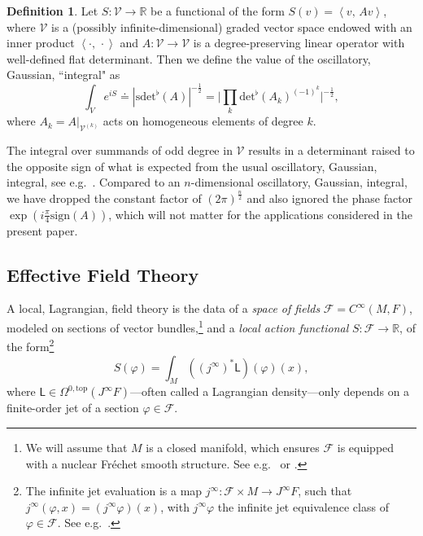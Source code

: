\documentclass[reqno]{amsart}
\theoremstyle{definition}
\newtheorem{defn}[thm]{Definition}
\theoremstyle{remark}
\renewcommand{\phi}{\varphi}
\newcommand{\V}{\mathcal{V}}
\newcommand{\R}{\mathbb{R}}
\newcommand{\C}{C^\infty}
\newcommand{\F}{\mathcal{F}}
\newcommand{\sfL}{\mathsf{L}}
\renewcommand{\det}{\mathrm{det}^\flat}
\newcommand{\sdet}{\mathrm{sdet}^\flat}
\newcommand{\pair}[2]{\left\langle #1,\, #2 \right\rangle}
\begin{document}
\begin{defn}
\label{fresnel}
Let $S: \V \to \R$ be a functional of the form $S(v) = \pair{v}{Av}$, where $\V$ is a (possibly infinite-dimensional) graded vector space endowed with an inner product $\pair{\cdot}{\cdot}$ and $A:\V \to \V$ is a degree-preserving linear operator with well-defined flat determinant. Then we define the value of the oscillatory, Gaussian, ``integral" as
\begin{equation}
    \int_V e^{iS} \doteq  |\sdet(A)|^{-\frac{1}{2}}= \bigl|\prod_k \det(A_k)^{(-1)^k}\bigr|^{-\frac{1}{2}},
\end{equation}
where $A_k=A\vert_{\mathcal{V}^{(k)}}$ acts on homogeneous elements of degree $k$.
\end{defn}
\begin{rmk}
\label{phase_factor}
The integral over summands of odd degree in $\mathcal{V}$ results in a determinant raised to the opposite sign of what is expected from the usual oscillatory, Gaussian, integral, see e.g.\ \cite{mnev}. Compared to an $n$-dimensional oscillatory, Gaussian, integral, we have dropped the constant factor of $(2\pi)^{\frac{n}{2}}$ and also ignored the phase factor $\exp(i\frac{\pi}{4}\mathrm{sign}(A))$, which will not matter for the applications considered in the present paper.
\end{rmk}
 



\subsection{Effective Field Theory}
\label{EFT}

A local, Lagrangian, field theory is the data of a \emph{space of fields} $\F=\C(M,F)$, modeled on sections of vector bundles,\footnote{We will assume that $M$ is a closed manifold, which ensures $\mathcal{F}$ is equipped with a nuclear Fr\'echet smooth structure. See e.g.\ \cite[Section 30.1, unnumbered Proposition]{kriegl_michor} or \cite[Appendix 2]{costello}.} and a \emph{local action functional} $S: \F \to \R$, of the form\footnote{The infinite jet evaluation is a map $j^\infty\colon\mathcal{F}\times M\to J^\infty F$, such that $j^\infty(\phi,x) = (j^\infty\phi)(x)$, with $j^\infty\phi$ the infinite jet equivalence class of $\phi\in \mathcal{F}$.  See e.g.\  \cite{Anderson:1989,AndersonTorre,BlohmannLFT}.}
\begin{equation}
\label{local_functional}
    S(\phi) = \int_M ((j^\infty)^*\sfL)(\phi)(x),
\end{equation}
where $\sfL\in\Omega^{0,\mathrm{top}}(J^\infty F)$---often called a Lagrangian density---only depends on a finite-order jet of a section $\phi \in \F$.  
\end{document}
